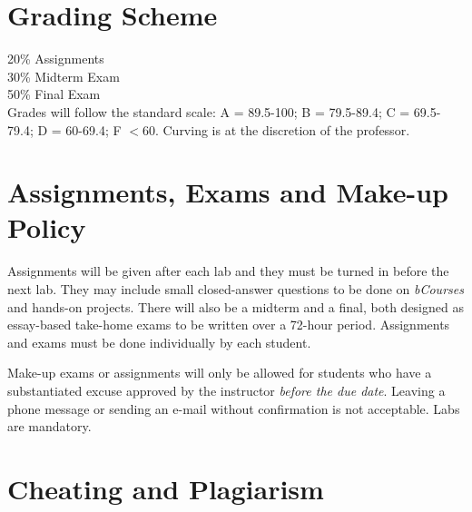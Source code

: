 \documentclass[letterpaper]{inzane_syllabus} %
\begin{document}
\vspace{0.5cm}
\section{Grading Scheme}

20\% Assignments \\
30\% Midterm Exam \\
50\% Final Exam \\

Grades will follow the standard scale: A = 89.5-100; B = 79.5-89.4; C = 69.5-79.4; D = 60-69.4; F  $<$60. Curving is at the discretion of the professor. 



\newpage %

\makeSide %


\vspace{0.5cm}
\section{Assignments, Exams and Make-up Policy}

Assignments will be given after each lab and they must be turned in before the next lab. They may include small closed-answer questions to be done on \emph{bCourses} and hands-on projects. There will also be a midterm  and a final, both designed as essay-based take-home exams to be written over a 72-hour period. Assignments and exams must be done individually by each student.

Make-up exams or assignments will only be allowed for students who have a substantiated excuse approved by the instructor \emph{before the due date}. Leaving a phone message or sending an e-mail without confirmation is not acceptable. Labs are mandatory.

\vspace{0.5cm}
\section{Cheating and Plagiarism}
\end{document}
